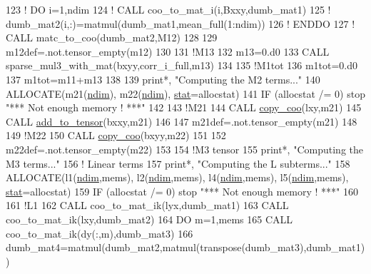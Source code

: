 \begin{DoxyCode}
123     \textcolor{comment}{! DO i=1,ndim}
124     \textcolor{comment}{!    CALL coo\_to\_mat\_i(i,Bxxy,dumb\_mat1)}
125     \textcolor{comment}{!    dumb\_mat2(i,:)=matmul(dumb\_mat1,mean\_full(1:ndim))}
126     \textcolor{comment}{! ENDDO}
127     \textcolor{comment}{! CALL matc\_to\_coo(dumb\_mat2,M12)}
128 
129     m12def=.not.tensor\_empty(m12)
130 
131     \textcolor{comment}{!M13}
132     m13=0.d0
133     \textcolor{keyword}{CALL }sparse\_mul3\_with\_mat(bxyy,corr\_i\_full,m13)
134 
135     \textcolor{comment}{!M1tot}
136     m1tot=0.d0
137     m1tot=m11+m13
138 
139     print*, \textcolor{stringliteral}{"Computing the M2 terms..."}
140     \textcolor{keyword}{ALLOCATE}(m21(\hyperlink{namespaceparams_a2323fe1773f086e20c14f266351c482b}{ndim}), m22(\hyperlink{namespaceparams_a2323fe1773f086e20c14f266351c482b}{ndim}), \hyperlink{namespacestat}{stat}=allocstat)
141     \textcolor{keywordflow}{IF} (allocstat /= 0) stop \textcolor{stringliteral}{"*** Not enough memory ! ***"}
142 
143     \textcolor{comment}{!M21}
144     \textcolor{keyword}{CALL }\hyperlink{namespacetensor_a14f95c256cdf137ca0767ddb3c87deea}{copy\_coo}(lxy,m21)
145     \textcolor{keyword}{CALL }\hyperlink{namespacetensor_aad7cd55f3a4cec4676cc7ca34b05f1a8}{add\_to\_tensor}(bxxy,m21)
146 
147     m21def=.not.tensor\_empty(m21)
148     
149     \textcolor{comment}{!M22}
150     \textcolor{keyword}{CALL }\hyperlink{namespacetensor_a14f95c256cdf137ca0767ddb3c87deea}{copy\_coo}(bxyy,m22)
151 
152     m22def=.not.tensor\_empty(m22)
153     
154     \textcolor{comment}{!M3 tensor}
155     print*, \textcolor{stringliteral}{"Computing the M3 terms..."}
156     \textcolor{comment}{! Linear terms}
157     print*, \textcolor{stringliteral}{"Computing the L subterms..."}
158     \textcolor{keyword}{ALLOCATE}(l1(\hyperlink{namespaceparams_a2323fe1773f086e20c14f266351c482b}{ndim},mems), l2(\hyperlink{namespaceparams_a2323fe1773f086e20c14f266351c482b}{ndim},mems), l4(\hyperlink{namespaceparams_a2323fe1773f086e20c14f266351c482b}{ndim},mems), l5(\hyperlink{namespaceparams_a2323fe1773f086e20c14f266351c482b}{ndim},mems), 
      \hyperlink{namespacestat}{stat}=allocstat)
159     \textcolor{keywordflow}{IF} (allocstat /= 0) stop \textcolor{stringliteral}{"*** Not enough memory ! ***"}
160     
161     \textcolor{comment}{!L1}
162     \textcolor{keyword}{CALL }coo\_to\_mat\_ik(lyx,dumb\_mat1)
163     \textcolor{keyword}{CALL }coo\_to\_mat\_ik(lxy,dumb\_mat2)
164     \textcolor{keywordflow}{DO} m=1,mems
165        \textcolor{keyword}{CALL }coo\_to\_mat\_ik(dy(:,m),dumb\_mat3)
166        dumb\_mat4=matmul(dumb\_mat2,matmul(transpose(dumb\_mat3),dumb\_mat1))

\end{DoxyCode}
